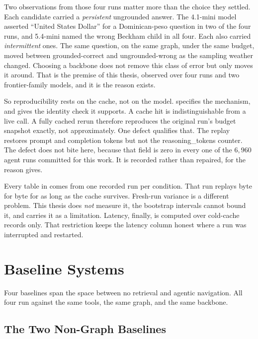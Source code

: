 Two observations from those four runs matter more than the choice they settled.
Each candidate carried a \emph{persistent} ungrounded answer. The 4.1-mini model
asserted ``United States Dollar'' for a Dominican-peso question in two of the
four runs, and 5.4-mini named the wrong Beckham child in all four. Each also
carried \emph{intermittent} ones. The same question, on the same graph, under
the same budget, moved between grounded-correct and ungrounded-wrong as the
sampling weather changed. Choosing a backbone does not remove this class of
error but only moves it around. That is the premise of this thesis, observed
over four runs and two frontier-family models, and it is the reason
 exists.

So reproducibility rests on the cache, not on the model.
 specifies the mechanism, and
 gives the identity check it supports. A cache hit is
indistinguishable from a live call. A fully cached rerun therefore reproduces
the original run's budget snapshot exactly, not approximately. One defect
qualifies that. The replay restores prompt and completion tokens but not the
\textsf{reasoning\_tokens} counter. The defect does not bite here, because that
field is zero in every one of the $6{,}960$ agent runs committed for this work.
It is recorded rather than repaired, for the reason 
gives.

Every table in  comes from one recorded run per condition.
That run replays byte for byte for as long as the cache survives. Fresh-run
variance is a different problem. This thesis does \emph{not} measure it, the
bootstrap intervals cannot bound it, and  carries it as a
limitation. Latency, finally, is computed over cold-cache records only. That
restriction keeps the latency column honest where a run was interrupted and
restarted.

\section{Baseline Systems}\label{sec:baselines}

Four baselines span the space between no retrieval and agentic navigation. All
four run against the same tools, the same graph, and the same backbone.

\subsection{The Two Non-Graph Baselines}

